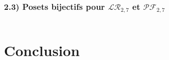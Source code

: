 \documentclass{beamer}
\begin{document}
\begin{frame} %
    \frametitle{2.3) Posets \textbf{bijectifs} pour $\mathcal{LR}_{2,7}$ et
        $\mathcal{PF}_{2,7}$}
        \begin{columns}
            \begin{column}{0.5\textwidth}
                
            \end{column}
            \begin{column}{0.5\textwidth}
                
            \end{column}
        \end{columns}
\end{frame}

\section{Conclusion} %
\end{document}
